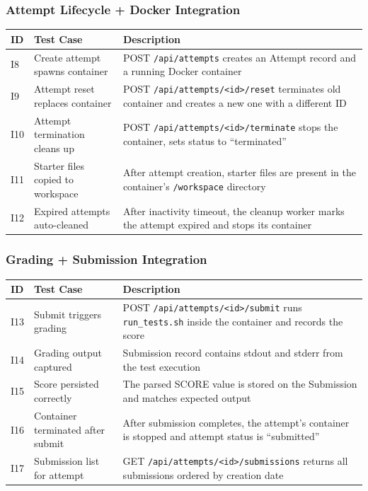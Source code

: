 \documentclass[12pt, letterpaper]{article}
\begin{document}
\subsubsection{Attempt Lifecycle + Docker Integration}

\begin{longtable}{p{0.5cm} p{4.5cm} p{8.5cm}}
    \toprule
    \textbf{ID} & \textbf{Test Case} & \textbf{Description} \\
    \midrule
    I8 & Create attempt spawns container & POST \texttt{/api/attempts} creates an Attempt record and a running Docker container \\
    I9 & Attempt reset replaces container & POST \texttt{/api/attempts/<id>/reset} terminates old container and creates a new one with a different ID \\
    I10 & Attempt termination cleans up & POST \texttt{/api/attempts/<id>/terminate} stops the container, sets status to ``terminated'' \\
    I11 & Starter files copied to workspace & After attempt creation, starter files are present in the container's \texttt{/workspace} directory \\
    I12 & Expired attempts auto-cleaned & After inactivity timeout, the cleanup worker marks the attempt expired and stops its container \\
    \bottomrule
\end{longtable}

\subsubsection{Grading + Submission Integration}

\begin{longtable}{p{0.5cm} p{4.5cm} p{8.5cm}}
    \toprule
    \textbf{ID} & \textbf{Test Case} & \textbf{Description} \\
    \midrule
    I13 & Submit triggers grading & POST \texttt{/api/attempts/<id>/submit} runs \texttt{run\_tests.sh} inside the container and records the score \\
    I14 & Grading output captured & Submission record contains stdout and stderr from the test execution \\
    I15 & Score persisted correctly & The parsed SCORE value is stored on the Submission and matches expected output \\
    I16 & Container terminated after submit & After submission completes, the attempt's container is stopped and attempt status is ``submitted'' \\
    I17 & Submission list for attempt & GET \texttt{/api/attempts/<id>/submissions} returns all submissions ordered by creation date \\
    \bottomrule
\end{longtable}
\end{document}
